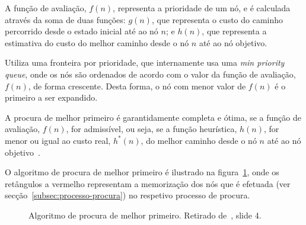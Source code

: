 A função de avaliação, $f(n)$, representa a prioridade de um nó, e é calculada através da soma de duas funções: $g(n)$, que representa o custo do caminho percorrido desde o estado inicial até ao nó $n$; e $h(n)$, que representa a estimativa do custo do melhor caminho desde o nó $n$ até ao nó objetivo.

Utiliza uma fronteira por prioridade, que internamente usa uma \textit{min priority queue}, onde os nós são ordenados de acordo com o valor da função de avaliação, $f(n)$, de forma crescente.
Desta forma, o nó com menor valor de $f(n)$ é o primeiro a ser expandido.

A procura de melhor primeiro é garantidamente completa e ótima, se a função de avaliação, $f(n)$, for admissível, ou seja, se a função heurística, $h(n)$, for menor ou igual ao custo real, $h^*(n)$, do melhor caminho desde o nó $n$ até ao nó objetivo~\cite{ist:leic:resumos:procura-cega}.

O algoritmo de procura de melhor primeiro é ilustrado na figura~\ref{fig:alg-proc-melh-prim}, onde os retângulos a vermelho representam a memorização dos nós que é efetuada (ver secção~\ref{subsec:processo-procura}) no respetivo processo de procura.

\begin{figure}[H]
    \begin{center}
    \end{center}
    \caption{Algoritmo de procura de melhor primeiro. Retirado de~\cite{isel:iasa:slides:proc-espaco-estados-parte-2}, slide 4.}
    \label{fig:alg-proc-melh-prim}
\end{figure}

